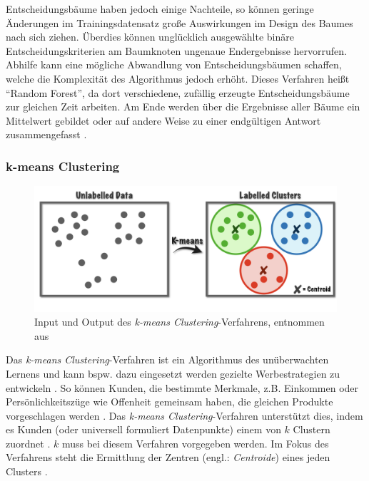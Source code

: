 Entscheidungsbäume haben jedoch einige Nachteile, so können geringe Änderungen im Trainingsdatensatz große Auswirkungen im Design des Baumes nach sich ziehen. Überdies können unglücklich ausgewählte binäre Entscheidungskriterien am Baumknoten ungenaue Endergebnisse hervorrufen. Abhilfe kann eine mögliche Abwandlung von Entscheidungsbäumen schaffen, welche die Komplexität des Algorithmus jedoch erhöht. Dieses Verfahren heißt \enquote{Random Forest}, da dort verschiedene, zufällig erzeugte Entscheidungsbäume zur gleichen Zeit arbeiten. Am Ende werden über die Ergebnisse aller Bäume ein Mittelwert gebildet oder auf andere Weise zu einer endgültigen Antwort zusammengefasst \cite{Ng.2018}.

\subsubsection{k-means Clustering}
\label{subsubsec:k-means-Clustering}
\begin{figure}
    \centering
    \includegraphics[scale=0.16]{pic/MA-Bilder/k-means-Clustering.png}
    \caption{Input und Output des \emph{k-means Clustering}-Verfahrens, entnommen aus \cite{Fiori-online}}
    \label{Fig:kmeans}
\end{figure}
Das \emph{k-means Clustering}-Verfahren ist ein Algorithmus des unüberwachten Lernens und kann bspw. dazu eingesetzt werden gezielte Werbestrategien zu entwickeln \cite{Matzka.2021, Ng.2018}. So können Kunden, die bestimmte Merkmale, z.B. Einkommen oder Persönlichkeitszüge wie Offenheit gemeinsam haben, die gleichen Produkte vorgeschlagen werden \cite{Ng.2018}. Das \emph{k-means Clustering}-Verfahren unterstützt dies, indem es Kunden (oder universell formuliert Datenpunkte) einem von $k$ Clustern zuordnet \cite{ayodele}. $k$ muss bei diesem Verfahren vorgegeben werden. Im Fokus des Verfahrens steht die Ermittlung der Zentren (engl.: \emph{Centroide}) eines jeden Clusters \cite{Cleve.2020}.
\newline

